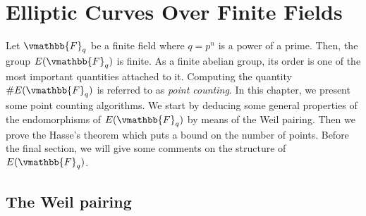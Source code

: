 \chapter{Elliptic Curves Over Finite Fields}
\label{chapter:elli-pointcount}

Let $\vmathbb{F}_q$ be a finite field where $q = p^n$ is a power of a prime. Then, the group 
$E(\vmathbb{F}_q)$ is finite. As a finite abelian group, its order is one of the most important 
quantities attached to it. Computing the quantity $\#E(\vmathbb{F}_q)$ is referred to as 
\textit{point counting}. In this chapter, we present some point counting algorithms. We start by 
deducing some general properties of the endomorphisms of $E(\vmathbb{F}_q)$ by means of the Weil 
pairing. Then we prove the Hasse's theorem which puts a bound on the number of points. Before the 
final section, we will give some comments on the structure of $E(\vmathbb{F}_q)$.









\section{The Weil pairing}

